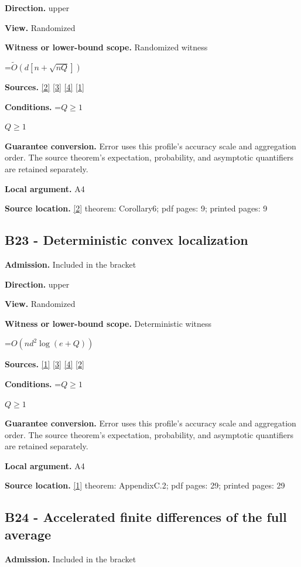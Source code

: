 \documentclass[10pt,a4paper]{article}
\newcommand{\AtlasMath}[1]{\par\begingroup\centering\setbox0=\hbox{$\displaystyle #1$}\ifdim\wd0>1.4\linewidth\typeout{ATLAS WIDE FORMULA: \the\wd0}\fi\ifdim\wd0>\linewidth\resizebox{\linewidth}{!}{\box0}\else\box0\fi\par\endgroup}
\newcommand{\AtlasInlineMath}[1]{\begingroup\setbox0=\hbox{$#1$}\ifdim\wd0>.4\linewidth\endgroup\AtlasMath{#1}\else\endgroup$#1$\fi}
\begin{document}
\textbf{Direction.} upper

\textbf{View.} Randomized

\textbf{Witness or lower-bound scope.} Randomized witness

\AtlasMath{\widetilde{O}(d[n+\sqrt{nQ}])}
\textbf{Sources.} \href{https://arxiv.org/abs/2109.08858}{[2]} \href{https://arxiv.org/html/2607.16558v2}{[3]} \href{https://www.mathnet.ru/php/archive.phtml?jrnid=mzm&option_lang=eng&paperid=1697&wshow=paper}{[4]} \href{https://arxiv.org/html/2610.00345v1}{[1]}

\textbf{Conditions.} \AtlasInlineMath{Q\ge1}

\textbf{Guarantee conversion.} Error uses this profile's accuracy scale and aggregation order. The source theorem's expectation, probability, and asymptotic quantifiers are retained separately.

\textbf{Local argument.} A4

\textbf{Source location.} \href{https://arxiv.org/abs/2109.08858}{[2]} theorem: Corollary6; pdf pages: 9; printed pages: 9

\subsection{B23 - Deterministic convex localization}
\textbf{Admission.} Included in the bracket

\textbf{Direction.} upper

\textbf{View.} Randomized

\textbf{Witness or lower-bound scope.} Deterministic witness

\AtlasMath{O(nd^2\log(e+Q))}
\textbf{Sources.} \href{https://arxiv.org/html/2610.00345v1}{[1]} \href{https://arxiv.org/html/2607.16558v2}{[3]} \href{https://www.mathnet.ru/php/archive.phtml?jrnid=mzm&option_lang=eng&paperid=1697&wshow=paper}{[4]} \href{https://arxiv.org/abs/2109.08858}{[2]}

\textbf{Conditions.} \AtlasInlineMath{Q\ge1}

\textbf{Guarantee conversion.} Error uses this profile's accuracy scale and aggregation order. The source theorem's expectation, probability, and asymptotic quantifiers are retained separately.

\textbf{Local argument.} A4

\textbf{Source location.} \href{https://arxiv.org/html/2610.00345v1}{[1]} theorem: AppendixC.2; pdf pages: 29; printed pages: 29

\subsection{B24 - Accelerated finite differences of the full average}
\textbf{Admission.} Included in the bracket
\end{document}
